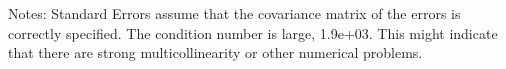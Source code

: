 Notes: \newline
 [1] Standard Errors assume that the covariance matrix of the errors is correctly specified. \newline
 [2] The condition number is large, 1.9e+03. This might indicate that there are \newline
 strong multicollinearity or other numerical problems.
